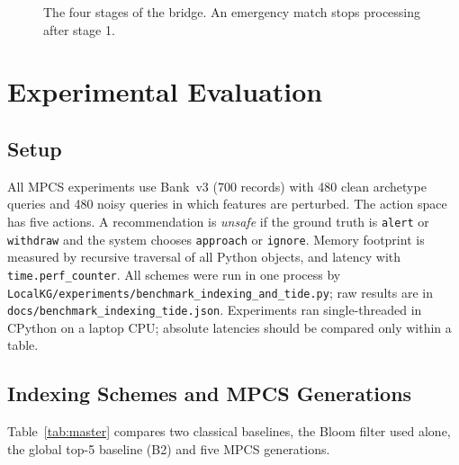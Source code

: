 \documentclass[12pt,a4paper,oneside]{report}
\newcommand{\code}[1]{\texttt{\small #1}}
\begin{document}
\begin{figure}[H]
\centering
{}
\caption{The four stages of the bridge. An emergency match stops processing after stage 1.}
\label{fig:bridge}
\end{figure}

\chapter{Experimental Evaluation}\label{ch:results}
\section{Setup}
All MPCS experiments use Bank~v3 (700 records) with 480 clean archetype queries and 480 noisy queries in which features are perturbed. The action space has five actions. A recommendation is \emph{unsafe} if the ground truth is \code{alert} or \code{withdraw} and the system chooses \code{approach} or \code{ignore}. Memory footprint is measured by recursive traversal of all Python objects, and latency with \code{time.perf\_counter}. All schemes were run in one process by \code{LocalKG/experiments/benchmark\_indexing\_and\_tide.py}; raw results are in \code{docs/benchmark\_indexing\_tide.json}. Experiments ran single-threaded in CPython on a laptop CPU; absolute latencies should be compared only within a table.

\section{Indexing Schemes and MPCS Generations}
Table~\ref{tab:master} compares two classical baselines, the Bloom filter used alone, the global top-5 baseline (B2) and five MPCS generations.
\end{document}
